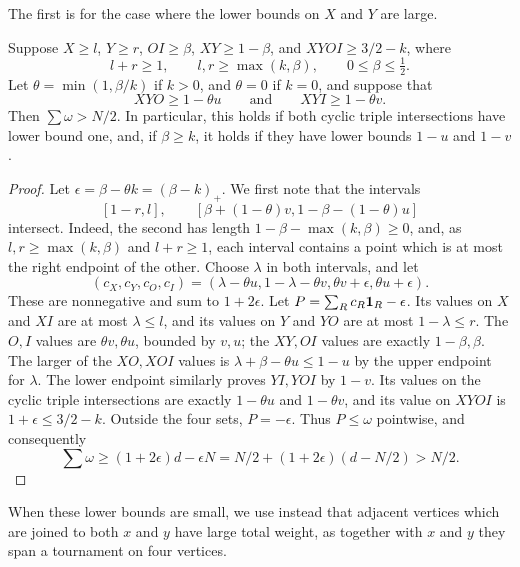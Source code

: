 The first is for the case where the lower bounds on $X$ and $Y$ are large.

\begin{lemma}
\label{root391:large-sum-count}\label{root406:large-count-part}
Suppose $X\ge l$, $Y\ge r$, $OI\ge\beta$,
$XY\ge1-\beta$, and $XYOI\ge3/2-k$, where
\[
 l+r\ge1,\qquad l,r\ge\max(k,\beta),\qquad
 0\le\beta\le\tfrac12.
\]
Let $\theta=\min(1,\beta/k)$ if $k>0$, and $\theta=0$
if $k=0$, and suppose that
\[
 XYO\ge1-\theta u\qquad\text{and}\qquad XYI\ge1-\theta v.
\]
Then $\sum\omega>N/2$. In particular, this holds if both cyclic triple intersections have lower bound one, and, if $\beta\ge k$, it holds if they have lower bounds $1-u$ and $1-v$.
\end{lemma}
\begin{proof}
Let $\epsilon=\beta-\theta k=(\beta-k)_+$. We first note that the intervals
\[
 [1-r,l],\qquad
 [\beta+(1-\theta)v,1-\beta-(1-\theta)u]
\]
intersect. Indeed, the second has length
$1-\beta-\max(k,\beta)\ge0$, and, as $l,r\ge\max(k,\beta)$ and $l+r\ge1$, each interval contains a point which is at most the right endpoint of the other. Choose $\lambda$ in both intervals, and let
\[
 (c_X,c_Y,c_O,c_I)=(\lambda-\theta u,1-\lambda-\theta v,
 \theta v+\epsilon,\theta u+\epsilon).
\]
These are nonnegative and sum to $1+2\epsilon$.
Let $P=\sum_Rc_R\mathbf 1_R-\epsilon$. Its values on $X$ and $XI$ are at
most $\lambda\le l$, and its values on $Y$ and $YO$ are at most $1-\lambda\le r$.
The $O,I$ values are $\theta v,\theta u$, bounded by $v,u$;
the $XY,OI$ values are exactly $1-\beta,\beta$.
The larger of the $XO,XOI$ values is
$\lambda+\beta-\theta u\le1-u$ by the upper endpoint for $\lambda$.
The lower endpoint similarly proves $YI,YOI$ by $1-v$.
Its values on the cyclic triple intersections are exactly $1-\theta u$ and $1-\theta v$,
and its value on $XYOI$ is $1+\epsilon\le3/2-k$.
Outside the four sets, $P=-\epsilon$. Thus $P\le\omega$ pointwise, and
consequently
\[
 \sum\omega\ge(1+2\epsilon)d-\epsilon N
 =N/2+(1+2\epsilon)(d-N/2)>N/2.
\]
\end{proof}

When these lower bounds are small, we use instead that adjacent vertices which are joined to both $x$ and $y$ have large total weight, as together with $x$ and $y$ they span a tournament on four vertices.


